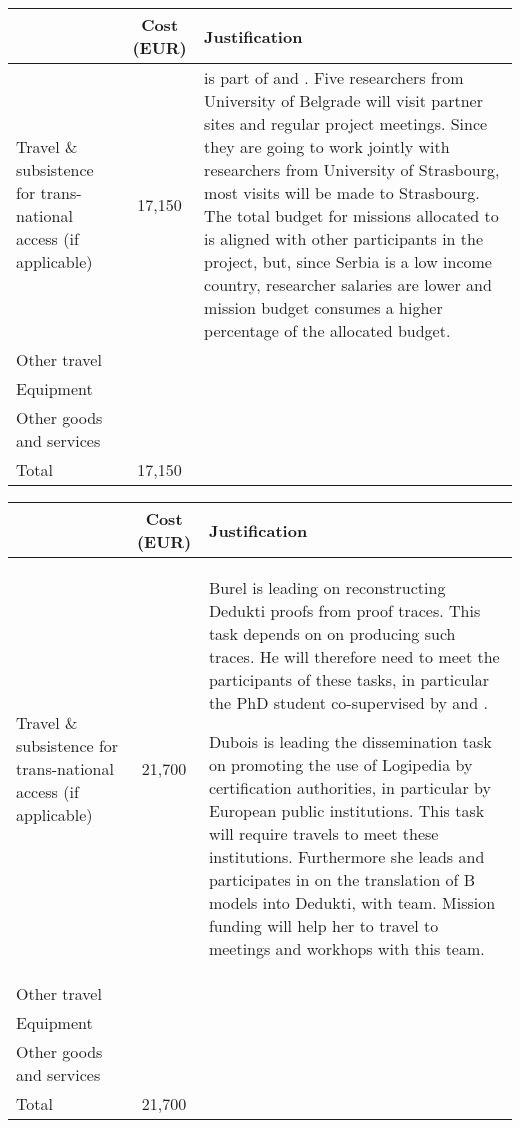 \begin{longtable*}{|p{.25\textwidth}|c|p{0.55\textwidth}|}
\hline
   & Cost (EUR)  & Justification \\
  \hline
  Travel \& subsistence for trans-national access (if applicable) & 17,150 &

is part of  and .
Five researchers from University of Belgrade will visit partner sites
and regular project meetings. Since they are going to work jointly
with researchers from University of Strasbourg, most visits will be
made to Strasbourg. The total budget for missions allocated to
 is aligned with other participants in the
project, but, since Serbia is a low income country, researcher salaries
are lower and mission budget consumes a higher percentage of the
allocated budget.
  \\
  \hline
  Other travel & & \\
  \hline
  Equipment & & \\
  \hline
  Other goods and services & & \\
  \hline
  Total & 17,150 & \\
  \hline
\end{longtable*}

\begin{longtable*}{|p{.25\textwidth}|c|p{0.55\textwidth}|}
\hline
   & Cost (EUR)  & Justification \\
  \hline
  Travel \& subsistence for trans-national access (if applicable) & 21,700 &

  Burel is leading  on
reconstructing Dedukti proofs from proof traces. This task depends on
 on producing such traces. He will
therefore need to meet the participants of these tasks, in particular
the PhD student co-supervised by  and .

Dubois is leading the dissemination task  on promoting the use of Logipedia by certification authorities, in particular by European public institutions. This task will require travels to meet these institutions. Furthermore she leads and participates in  on the translation of B models into Dedukti, with  team. Mission funding will help her to travel to meetings and workhops with this team.\\
  \hline
  Other travel & & \\
  \hline
  Equipment & & \\
  \hline
  Other goods and services & & \\
  \hline
  Total & 21,700 & \\
  \hline
\end{longtable*}

